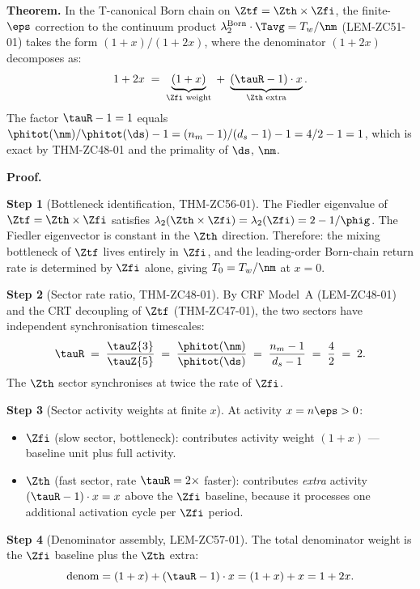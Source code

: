 \documentclass[12pt, a4paper]{article}
\begin{document}
\begin{formalbox}[title={THM-ZC57-01: Two-Sector Correction
  Theorem --- $(1+x)/(1+2x)$ from Sector Rate Asymmetry
  ($R_0$, Exact; promotes CONJ-ZC56-01)}]
\textbf{Theorem.}
In the T-canonical Born chain on $\Ztf=\Zth\times\Zfi$,
the finite-$\eps$ correction to the continuum product
$\lambda_2^{\rm Born}\cdot\Tavg = T_w/\nm$ (LEM-ZC51-01)
takes the form $(1+x)/(1+2x)$,
where the denominator $(1+2x)$ decomposes as:
\begin{equation}
  1+2x
  \;=\; \underbrace{(1+x)}_{\text{$\Zfi$ weight}}
    \;+\; \underbrace{(\tauR-1)\cdot x}_{\text{$\Zth$ extra}} .
  \label{eq:denom-decomp}
\end{equation}
The factor $\tauR-1=1$ equals
$\phitot(\nm)/\phitot(\ds)-1 = (n_m-1)/(d_s-1)-1 = 4/2-1 = 1$,
which is exact by THM-ZC48-01 and the primality of $\ds$, $\nm$.

\medskip
\textbf{Proof.}

\textbf{Step 1} (Bottleneck identification, THM-ZC56-01).
The Fiedler eigenvalue of $\Ztf=\Zth\times\Zfi$ satisfies
$\lambda_2(\Zth\times\Zfi)=\lambda_2(\Zfi)=2-1/\phig$.
The Fiedler eigenvector is constant in the $\Zth$ direction.
Therefore: the mixing bottleneck of $\Ztf$ lives entirely
in $\Zfi$, and the leading-order Born-chain return rate is
determined by $\Zfi$ alone, giving $T_0=T_w/\nm$ at $x=0$.

\textbf{Step 2} (Sector rate ratio, THM-ZC48-01).
By CRF Model~A (LEM-ZC48-01) and the CRT decoupling
of $\Ztf$ (THM-ZC47-01), the two sectors have independent
synchronisation timescales:
\[
  \tauR \;=\; \frac{\tauZ{3}}{\tauZ{5}}
  \;=\; \frac{\phitot(\nm)}{\phitot(\ds)}
  \;=\; \frac{n_m-1}{d_s-1}
  \;=\; \frac{4}{2} \;=\; 2.
\]
The $\Zth$ sector synchronises at twice the rate of $\Zfi$.

\textbf{Step 3} (Sector activity weights at finite $x$).
At activity $x=n\eps>0$:
\begin{itemize}[leftmargin=2em, noitemsep]
\item $\Zfi$ (slow sector, bottleneck): contributes activity
  weight $(1+x)$ --- baseline unit plus full activity.
\item $\Zth$ (fast sector, rate $\tauR=2\times$ faster):
  contributes \emph{extra} activity $(\tauR-1)\cdot x = x$
  above the $\Zfi$ baseline, because it processes one
  additional activation cycle per $\Zfi$ period.
\end{itemize}

\textbf{Step 4} (Denominator assembly, LEM-ZC57-01).
The total denominator weight is the $\Zfi$ baseline plus
the $\Zth$ extra:
\[
  \text{denom}
  = (1+x) + (\tauR-1)\cdot x
  = (1+x) + x
  = 1+2x.
\]


\end{formalbox}
\end{document}
